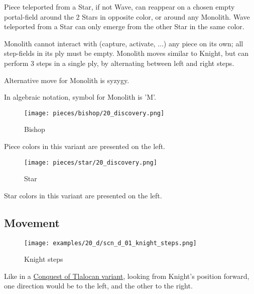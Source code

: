 Piece teleported from a Star, if not Wave, can reappear on a chosen empty
portal-field around the 2 Stars in opposite color, or around any Monolith.
Wave teleported from a Star can only emerge from the other Star in the same
color.

Monolith cannot interact with (capture, activate, ...) any piece on its own;
all step-fields in its ply must be empty. Monolith moves similar to Knight,
but can perform 3 steps in a single ply, by alternating between left and right
steps.

Alternative move for Monolith is syzygy.

In algebraic notation, symbol for Monolith is 'M'.

\clearpage %

\noindent
\begin{wrapfigure}[2]{l}{0.4\textwidth}
\centering
\texttt{[image: pieces/bishop/20\_discovery.png]}
\caption{Bishop}
\label{fig:bishop/20_discovery}
\end{wrapfigure}
Piece colors in this variant are presented on the left.

\vspace*{0.30\textheight}
\noindent
\begin{wrapfigure}[2]{l}{0.4\textwidth}
\centering
\texttt{[image: pieces/star/20\_discovery.png]}
\caption{Star}
\label{fig:star/20_discovery}
\end{wrapfigure}
Star colors in this variant are presented on the left.

\clearpage %

\subsection*{Movement}

\vspace*{-0.3\baselineskip}
\noindent
\begin{wrapfigure}[4]{l}{0.35\textwidth}
\centering
\texttt{[image: examples/20\_d/scn\_d\_01\_knight\_steps.png]}
\caption{Knight steps}
\label{fig:scn_d_01_knight_steps}
\end{wrapfigure}
Like in a \hyperref[fig:scn_cot_10_knight_directions]{Conquest of Tlalocan variant},
looking from Knight's position forward, one direction
would be to the left, and the other to the right.

